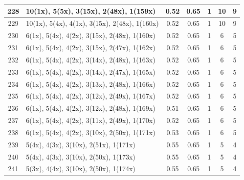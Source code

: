 \begin{small}
\begin{longtable}{|c|p{4cm}|c|c|c|c|c|}
  228 & 10(1x), 5(5x), 3(15x), 2(48x), 1(159x) & \cellcolor{colorGood}  0.52 & \cellcolor{colorGood} 0.65 & 1 & 10 & \cellcolor{colorGood} 9 \\   \hline
  229 & 10(1x), 5(4x), 4(1x), 3(15x), 2(48x), 1(160x) & \cellcolor{colorGood}  0.52 & \cellcolor{colorGood} 0.65 & 1 & 10 & \cellcolor{colorGood} 9 \\   \hline
  230 & 6(1x), 5(4x), 4(2x), 3(15x), 2(48x), 1(160x) & \cellcolor{colorGood}  0.52 & \cellcolor{colorGood} 0.65 & 1 & 6 & \cellcolor{colorGood} 5 \\   \hline
  231 & 6(1x), 5(4x), 4(2x), 3(15x), 2(47x), 1(162x) & \cellcolor{colorGood}  0.52 & \cellcolor{colorGood} 0.65 & 1 & 6 & \cellcolor{colorGood} 5 \\   \hline
  232 & 6(1x), 5(4x), 4(2x), 3(14x), 2(48x), 1(163x) & \cellcolor{colorGood}  0.52 & \cellcolor{colorGood} 0.65 & 1 & 6 & \cellcolor{colorGood} 5 \\   \hline
  233 & 6(1x), 5(4x), 4(2x), 3(14x), 2(47x), 1(165x) & \cellcolor{colorGood}  0.52 & \cellcolor{colorGood} 0.65 & 1 & 6 & \cellcolor{colorGood} 5 \\   \hline
  234 & 6(1x), 5(4x), 4(2x), 3(13x), 2(48x), 1(166x) & \cellcolor{colorGood}  0.52 & \cellcolor{colorGood} 0.65 & 1 & 6 & \cellcolor{colorGood} 5 \\   \hline
  235 & 6(1x), 5(4x), 4(2x), 3(12x), 2(49x), 1(167x) & \cellcolor{colorGood}  0.52 & \cellcolor{colorGood} 0.65 & 1 & 6 & \cellcolor{colorGood} 5 \\   \hline
  236 & 6(1x), 5(4x), 4(2x), 3(12x), 2(48x), 1(169x) & \cellcolor{colorGood}  0.51 & \cellcolor{colorGood} 0.65 & 1 & 6 & \cellcolor{colorGood} 5 \\   \hline
  237 & 6(1x), 5(4x), 4(2x), 3(11x), 2(49x), 1(170x) & \cellcolor{colorGood}  0.52 & \cellcolor{colorGood} 0.65 & 1 & 6 & \cellcolor{colorGood} 5 \\   \hline
  238 & 6(1x), 5(4x), 4(2x), 3(10x), 2(50x), 1(171x) & \cellcolor{colorGood}  0.53 & \cellcolor{colorGood} 0.65 & 1 & 6 & \cellcolor{colorGood} 5 \\   \hline
  239 & 5(4x), 4(3x), 3(10x), 2(51x), 1(171x) & \cellcolor{colorOK}  0.55 & \cellcolor{colorOK} 0.65 & 1 & 5 & \cellcolor{colorGood} 4 \\   \hline
  240 & 5(4x), 4(3x), 3(10x), 2(50x), 1(173x) & \cellcolor{colorOK}  0.55 & \cellcolor{colorOK} 0.65 & 1 & 5 & \cellcolor{colorGood} 4 \\   \hline
  241 & 5(3x), 4(4x), 3(10x), 2(50x), 1(174x) & \cellcolor{colorOK}  0.55 & \cellcolor{colorOK} 0.65 & 1 & 5 & \cellcolor{colorGood} 4 \\   \hline

\end{longtable}
\end{small}
